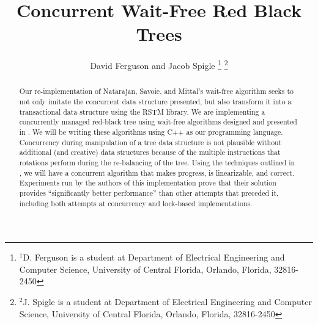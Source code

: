 \documentclass[letterpaper, 10 pt, conference]{ieeeconf}
\title{\LARGE \bf
	Concurrent Wait-Free Red Black Trees
}
\author{David Ferguson and Jacob Spigle%
	\thanks{$^{1}$D. Ferguson is a student at Department of Electrical Engineering and Computer Science, University of Central Florida, Orlando, Florida, 32816-2450 }%
	\thanks{$^{2}$J. Spigle is a student at Department of Electrical Engineering and Computer Science, University of Central Florida, Orlando, Florida, 32816-2450 %
}}
\begin{document}
	
	
	
	\maketitle
	\thispagestyle{empty}
	\pagestyle{empty}
	\lstset{language=C++, frame=single, basicstyle=\footnotesize\ttfamily, breaklines=true, stringstyle=\ttfamily, showstringspaces=false, frameround=ffff, autogobble=true, numbers=left,numberstyle=\tiny,numbersep=4pt}
	
	
	\begin{abstract}
		
		Our re-implementation of Natarajan, Savoie, and Mittal's wait-free algorithm \cite{c1} seeks to not only imitate the concurrent data structure presented, but also transform it into a transactional data structure using the RSTM library. We are implementing a concurrently managed red-black tree using wait-free algorithms designed and presented in \cite{c1}. We will be writing these algorithms using C++ as our programming language.  Concurrency during manipulation of a tree data structure is not plausible without additional (and creative) data structures because of the multiple instructions that rotations perform during the re-balancing of the tree. Using the techniques outlined in \cite{c1}, we will have a concurrent algorithm that makes progress, is linearizable, and correct. Experiments run by the authors of this implementation prove that their solution provides ``significantly better performance''\cite{c1} than other attempts that preceded it, including both attempts at concurrency and lock-based implementations.
		
	\end{abstract}
	
	
\end{document}

